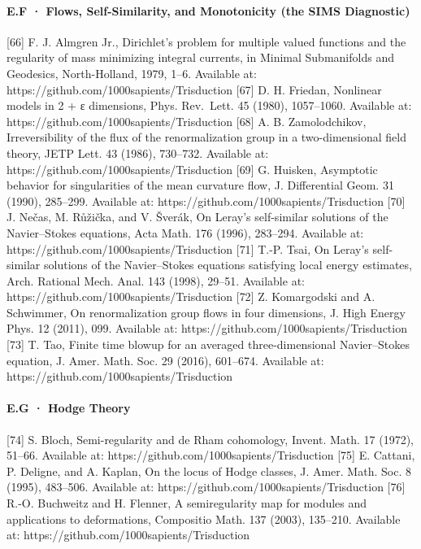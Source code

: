 \documentclass[10pt]{article}
\renewcommand{\_}{\origunderscore\allowbreak}
\begin{document}
\hypertarget{e.f-flows-self-similarity-and-monotonicity-the-sims-diagnostic}{%
\paragraph{E.F · Flows, Self-Similarity, and Monotonicity (the SIMS
Diagnostic)}\label{e.f-flows-self-similarity-and-monotonicity-the-sims-diagnostic}}

{[}66{]} F. J. Almgren Jr., Dirichlet's problem for multiple valued
functions and the regularity of mass minimizing integral currents, in
Minimal Submanifolds and Geodesics, North-Holland, 1979, 1--6. Available
at: https://github.com/1000sapients/Trisduction {[}67{]} D. H. Friedan,
Nonlinear models in 2 + ε dimensions, Phys. Rev.~Lett. 45 (1980),
1057--1060. Available at: https://github.com/1000sapients/Trisduction
{[}68{]} A. B. Zamolodchikov, Irreversibility of the flux of the
renormalization group in a two-dimensional field theory, JETP Lett. 43
(1986), 730--732. Available at:
https://github.com/1000sapients/Trisduction {[}69{]} G. Huisken,
Asymptotic behavior for singularities of the mean curvature flow, J.
Differential Geom. 31 (1990), 285--299. Available at:
https://github.com/1000sapients/Trisduction {[}70{]} J. Nečas, M.
Růžička, and V. Šverák, On Leray's self-similar solutions of the
Navier--Stokes equations, Acta Math. 176 (1996), 283--294. Available at:
https://github.com/1000sapients/Trisduction {[}71{]} T.-P. Tsai, On
Leray's self-similar solutions of the Navier--Stokes equations
satisfying local energy estimates, Arch. Rational Mech. Anal. 143
(1998), 29--51. Available at:
https://github.com/1000sapients/Trisduction {[}72{]} Z. Komargodski and
A. Schwimmer, On renormalization group flows in four dimensions, J. High
Energy Phys. 12 (2011), 099. Available at:
https://github.com/1000sapients/Trisduction {[}73{]} T. Tao, Finite time
blowup for an averaged three-dimensional Navier--Stokes equation, J.
Amer. Math. Soc. 29 (2016), 601--674. Available at:
https://github.com/1000sapients/Trisduction

\hypertarget{e.g-hodge-theory}{%
\paragraph{E.G · Hodge Theory}\label{e.g-hodge-theory}}

{[}74{]} S. Bloch, Semi-regularity and de Rham cohomology, Invent. Math.
17 (1972), 51--66. Available at:
https://github.com/1000sapients/Trisduction {[}75{]} E. Cattani, P.
Deligne, and A. Kaplan, On the locus of Hodge classes, J. Amer. Math.
Soc. 8 (1995), 483--506. Available at:
https://github.com/1000sapients/Trisduction {[}76{]} R.-O. Buchweitz and
H. Flenner, A semiregularity map for modules and applications to
deformations, Compositio Math. 137 (2003), 135--210. Available at:
https://github.com/1000sapients/Trisduction
\end{document}
